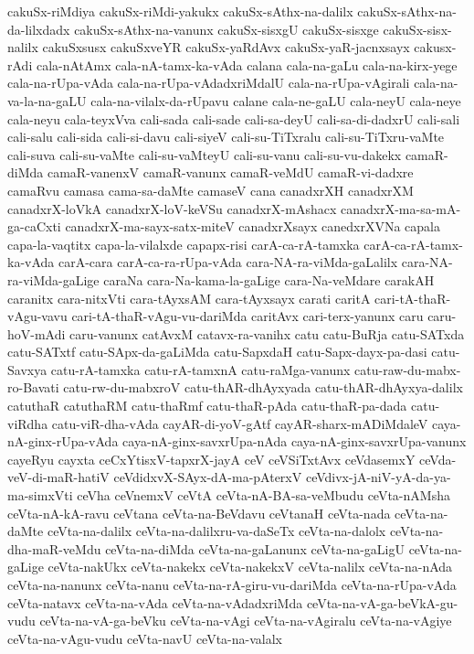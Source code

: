 {cakuSx-riMdiya
cakuSx-riMdi-yakukx
cakuSx-sAthx-na-dalilx
cakuSx-sAthx-na-da-lilxdadx
cakuSx-sAthx-na-vanunx
cakuSx-sisxgU
cakuSx-sisxge
cakuSx-sisx-nalilx
cakuSxsusx
cakuSxveYR
cakuSx-yaRdAvx
cakuSx-yaR-jacnxsayx
cakusx-rAdi
cala-nAtAmx
cala-nA-tamx-ka-vAda
calana
cala-na-gaLu
cala-na-kirx-yege
cala-na-rUpa-vAda
cala-na-rUpa-vAdadxriMdalU
cala-na-rUpa-vAgirali
cala-na-va-la-na-gaLU
cala-na-vilalx-da-rUpavu
calane
cala-ne-gaLU
cala-neyU
cala-neye
cala-neyu
cala-teyxVva
cali-sada
cali-sade
cali-sa-deyU
cali-sa-di-dadxrU
cali-sali
cali-salu
cali-sida
cali-si-davu
cali-siyeV
cali-su-TiTxralu
cali-su-TiTxru-vaMte
cali-suva
cali-su-vaMte
cali-su-vaMteyU
cali-su-vanu
cali-su-vu-dakekx
camaR-diMda
camaR-vanenxV
camaR-vanunx
camaR-veMdU
camaR-vi-dadxre
camaRvu
camasa
cama-sa-daMte
camaseV
cana
canadxrXH
canadxrXM
canadxrX-loVkA
canadxrX-loV-keVSu
canadxrX-mAshacx
canadxrX-ma-sa-mA-ga-caCxti
canadxrX-ma-sayx-satx-miteV
canadxrXsayx
canedxrXVNa
capala
capa-la-vaqtitx
capa-la-vilalxde
capapx-risi
carA-ca-rA-tamxka
carA-ca-rA-tamx-ka-vAda
carA-cara
carA-ca-ra-rUpa-vAda
cara-NA-ra-viMda-gaLalilx
cara-NA-ra-viMda-gaLige
caraNa
cara-Na-kama-la-gaLige
cara-Na-veMdare
carakAH
caranitx
cara-nitxVti
cara-tAyxsAM
cara-tAyxsayx
carati
caritA
cari-tA-thaR-vAgu-vavu
cari-tA-thaR-vAgu-vu-dariMda
caritAvx
cari-terx-yanunx
caru
caru-hoV-mAdi
caru-vanunx
catAvxM
catavx-ra-vanihx
catu
catu-BuRja
catu-SATxda
catu-SATxtf
catu-SApx-da-gaLiMda
catu-SapxdaH
catu-Sapx-dayx-pa-dasi
catu-Savxya
catu-rA-tamxka
catu-rA-tamxnA
catu-raMga-vanunx
catu-raw-du-mabx-ro-Bavati
catu-rw-du-mabxroV
catu-thAR-dhAyxyada
catu-thAR-dhAyxya-dalilx
catuthaR
catuthaRM
catu-thaRmf
catu-thaR-pAda
catu-thaR-pa-dada
catu-viRdha
catu-viR-dha-vAda
cayAR-di-yoV-gAtf
cayAR-sharx-mADiMdaleV
caya-nA-ginx-rUpa-vAda
caya-nA-ginx-savxrUpa-nAda
caya-nA-ginx-savxrUpa-vanunx
cayeRyu
cayxta
ceCxYtisxV-tapxrX-jayA
ceV
ceVSiTxtAvx
ceVdasemxY
ceVda-veV-di-maR-hatiV
ceVdidxvX-SAyx-dA-ma-pAterxV
ceVdivx-jA-niV-yA-da-ya-ma-simxVti
ceVha
ceVnemxV
ceVtA
ceVta-nA-BA-sa-veMbudu
ceVta-nAMsha
ceVta-nA-kA-ravu
ceVtana
ceVta-na-BeVdavu
ceVtanaH
ceVta-nada
ceVta-na-daMte
ceVta-na-dalilx
ceVta-na-dalilxru-va-daSeTx
ceVta-na-dalolx
ceVta-na-dha-maR-veMdu
ceVta-na-diMda
ceVta-na-gaLanunx
ceVta-na-gaLigU
ceVta-na-gaLige
ceVta-nakUkx
ceVta-nakekx
ceVta-nakekxV
ceVta-nalilx
ceVta-na-nAda
ceVta-na-nanunx
ceVta-nanu
ceVta-na-rA-giru-vu-dariMda
ceVta-na-rUpa-vAda
ceVta-natavx
ceVta-na-vAda
ceVta-na-vAdadxriMda
ceVta-na-vA-ga-beVkA-gu-vudu
ceVta-na-vA-ga-beVku
ceVta-na-vAgi
ceVta-na-vAgiralu
ceVta-na-vAgiye
ceVta-na-vAgu-vudu
ceVta-navU
ceVta-na-valalx
}

